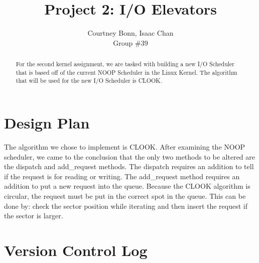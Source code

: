 \documentclass[letterpaper,10pt,draftclsnofoot,onecolumn,titlepage]{IEEEtran}
\def\name{Courtney Bonn, Isaac Chan}
\def\grp{Group \#39}
\begin{document}
\title{Project 2: I/O Elevators}
\author{\name \\ \grp}

\maketitle

\begin{abstract}
For the second kernel assignment, we are tasked with building a new I/O Scheduler that is based off of the current NOOP Scheduler in the Linux Kernel. 
The algorithm that will be used for the new I/O Scheduler is CLOOK. 
\end{abstract}

\clearpage
\section{Design Plan}
The algorithm we chose to implement is CLOOK. After examining the NOOP scheduler, we came to the conclusion that the only two methods to be altered 
are the dispatch and add\_request methods. The dispatch requires an addition to tell if the request is for reading or writing. The add\_request method 
requires an addition to put a new request into the queue. Because the CLOOK algorithm is circular, the request must be put in the correct spot in the 
queue. This can be done by: check the sector position while iterating and then insert the request if the sector is larger. 
    
\section{Version Control Log}

\end{document}
